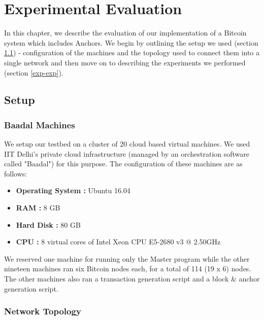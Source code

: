 \chapter{Experimental Evaluation} \label{ch-exp}

In this chapter, we describe the evaluation of our implementation of a Bitcoin system which includes Anchors. 
We begin by outlining the setup we used (section \ref{exp-setup}) - configuration of the machines and the topology used to connect them into a single network 
and then move on to describing the experiments we performed (section \ref{exp-exp}).


\section{Setup} \label{exp-setup}

\subsection{Baadal Machines} \label{exp-setup-baadal}

We setup our testbed on a cluster of 20 cloud based virtual machines. We used IIT Delhi's private cloud infrastructure (managed by an orchestration software called "Baadal") for this purpose. The configuration of these machines are as follows:

\begin{itemize}
    \item \textbf{Operating System :} Ubuntu 16.04
    \item \textbf{RAM :} 8 GB
    \item \textbf{Hard Disk :} 80 GB
    \item \textbf{CPU :} 8 virtual cores of Intel Xeon CPU E5-2680 v3 @ 2.50GHz
\end{itemize}

We reserved one machine for running only the Master program while the other nineteen machines ran six Bitcoin nodes each, for a total of 114 (19 x 6) nodes. The other machines also ran a transaction generation script and a block \& anchor generation script.


\newpage

\subsection{Network Topology} \label{exp-setup-topology}

